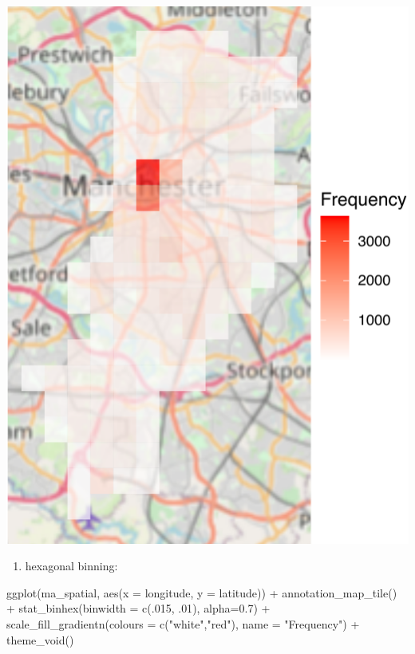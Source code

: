 \documentclass[
  krantz2]{krantz}
\makeatletter
\newenvironment{Shaded}{\begin{snugshade}}{\end{snugshade}}
\newcommand{\AttributeTok}[1]{\textcolor[rgb]{0.61,0.61,0.61}{#1}}
\newcommand{\DecValTok}[1]{\textcolor[rgb]{0.06,0.06,0.06}{#1}}
\newcommand{\FloatTok}[1]{\textcolor[rgb]{0.06,0.06,0.06}{#1}}
\newcommand{\FunctionTok}[1]{\textcolor[rgb]{0,0,0}{#1}}
\newcommand{\NormalTok}[1]{#1}
\newcommand{\SpecialCharTok}[1]{\textcolor[rgb]{0,0,0}{#1}}
\newcommand{\StringTok}[1]{\textcolor[rgb]{0.5,0.5,0.5}{#1}}
\providecommand{\tightlist}{%
  \setlength{\itemsep}{0pt}\setlength{\parskip}{0pt}}
\newenvironment{kframe}{%
\medskip{}
\setlength{\fboxsep}{.8em}
 \def\at@end@of@kframe{}%
 \ifinner\ifhmode%
  \def\at@end@of@kframe{\end{minipage}}%
  \begin{minipage}{\columnwidth}%
 \fi\fi%
 \def\FrameCommand##1{\hskip\@totalleftmargin \hskip-\fboxsep
 \colorbox{shadecolor}{##1}\hskip-\fboxsep
     \hskip-\linewidth \hskip-\@totalleftmargin \hskip\columnwidth}%
 \MakeFramed {\advance\hsize-\width
   \@totalleftmargin\z@ \linewidth\hsize
   \@setminipage}}%
 {\par\unskip\endMakeFramed%
 \at@end@of@kframe}
\renewenvironment{Shaded}{\begin{kframe}}{\end{kframe}}
\makeatother
\begin{document}
\includegraphics{crime_mapping_files/figure-latex/unnamed-chunk-128-1.pdf}

\begin{enumerate}
\def\labelenumi{\alph{enumi})}
\setcounter{enumi}{1}
\tightlist
\item
  hexagonal binning:
\end{enumerate}

\begin{Shaded}
\begin{Highlighting}[]
\FunctionTok{ggplot}\NormalTok{(ma\_spatial, }\FunctionTok{aes}\NormalTok{(}\AttributeTok{x =}\NormalTok{ longitude, }\AttributeTok{y =}\NormalTok{ latitude)) }\SpecialCharTok{+} 
  \FunctionTok{annotation\_map\_tile}\NormalTok{() }\SpecialCharTok{+} 
  \FunctionTok{stat\_binhex}\NormalTok{(}\AttributeTok{binwidth =} \FunctionTok{c}\NormalTok{(.}\DecValTok{015}\NormalTok{, .}\DecValTok{01}\NormalTok{), }\AttributeTok{alpha=}\FloatTok{0.7}\NormalTok{) }\SpecialCharTok{+} 
  \FunctionTok{scale\_fill\_gradientn}\NormalTok{(}\AttributeTok{colours =} \FunctionTok{c}\NormalTok{(}\StringTok{"white"}\NormalTok{,}\StringTok{"red"}\NormalTok{), }
                       \AttributeTok{name =} \StringTok{"Frequency"}\NormalTok{) }\SpecialCharTok{+} 
  \FunctionTok{theme\_void}\NormalTok{()}
\end{Highlighting}
\end{Shaded}
\end{document}
